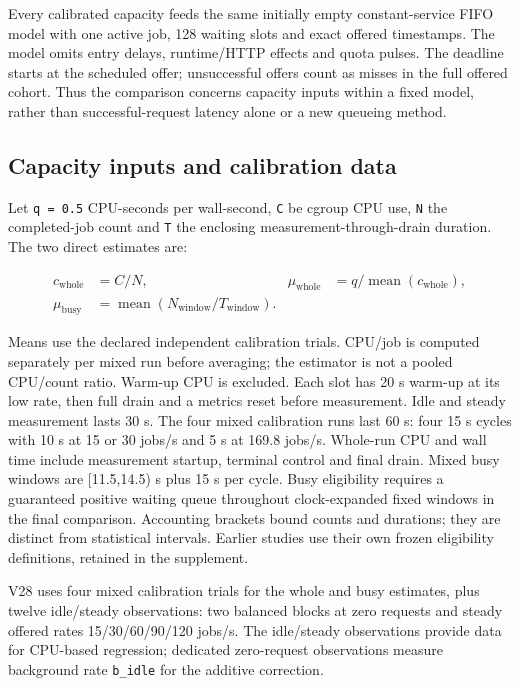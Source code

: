 \documentclass[11pt,a4paper]{article}
\begin{document}
Every calibrated capacity feeds the same initially empty constant-service
FIFO model with one active job, 128 waiting slots and exact offered timestamps.
The model omits entry delays, runtime/HTTP effects and quota pulses. The
deadline starts at the scheduled offer; unsuccessful offers count as misses
in the full offered cohort. Thus the comparison concerns capacity inputs
within a fixed model, rather than successful-request latency alone or a new
queueing method.

\subsection{Capacity inputs and calibration data}

Let \texttt{q = 0.5} CPU-seconds per wall-second, \texttt{C} be cgroup CPU use, \texttt{N} the
completed-job count and \texttt{T} the enclosing measurement-through-drain duration.
The two direct estimates are:

\begin{align*}c_{\mathrm{whole}} &= C/N, & \mu_{\mathrm{whole}} &= q/\operatorname{mean}(c_{\mathrm{whole}}),\\\mu_{\mathrm{busy}} &= \operatorname{mean}(N_{\mathrm{window}}/T_{\mathrm{window}}).\end{align*}

Means use the declared independent calibration trials. CPU/job is computed
separately per mixed run before averaging; the estimator is not a pooled
CPU/count ratio. Warm-up CPU is excluded. Each slot has 20 s warm-up at its
low rate, then full drain and a metrics reset before measurement. Idle and
steady measurement lasts 30 s. The four mixed calibration runs last 60 s:
four 15 s cycles with 10 s at 15 or 30 jobs/s and 5 s at 169.8 jobs/s.
Whole-run CPU and wall time include measurement startup, terminal control
and final drain. Mixed busy windows are [11.5,14.5) s plus 15 s per cycle. Busy eligibility
requires a guaranteed positive waiting queue throughout clock-expanded fixed
windows in the final comparison. Accounting brackets bound counts and
durations; they are distinct from statistical intervals. Earlier studies
use their own frozen eligibility definitions, retained in the supplement.

V28 uses four mixed calibration trials for the whole and busy estimates,
plus twelve idle/steady observations: two balanced blocks at zero requests
and steady offered rates 15/30/60/90/120 jobs/s. The idle/steady observations
provide data for CPU-based regression; dedicated zero-request observations
measure background rate \texttt{b\_idle} for the additive correction.
\end{document}
